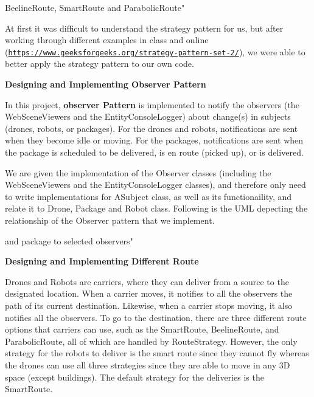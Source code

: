 \begin{center}  Beeline\+Route, Smart\+Route and Parabolic\+Route" \end{center} 

At first it was difficult to understand the strategy pattern for us, but after working through different examples in class and online (\href{https://www.geeksforgeeks.org/strategy-pattern-set-2/}{\tt https\+://www.\+geeksforgeeks.\+org/strategy-\/pattern-\/set-\/2/}), we were able to better apply the strategy pattern to our own code.

{\bfseries Designing and Implementing Observer Pattern} ~\newline


In this project, {\bfseries observer Pattern} is implemented to notify the observers (the Web\+Scene\+Viewers and the Entity\+Console\+Logger) about change(s) in subjects (drones, robots, or packages). For the drones and robots, notifications are sent when they become idle or moving. For the packages, notifications are sent when the package is scheduled to be delivered, is en route (picked up), or is delivered.

We are given the implementation of the Observer classes (including the Web\+Scene\+Viewers and the Entity\+Console\+Logger classes), and therefore only need to write implementations for A\+Subject class, as well as its functionaility, and relate it to Drone, Package and Robot class. Following is the U\+ML depecting the relationship of the Observer pattern that we implement.

\begin{center}  and package to selected observers" \end{center} 

{\bfseries Designing and Implementing Different Route} ~\newline


Drones and Robots are carriers, where they can deliver from a source to the designated location. When a carrier moves, it notifies to all the observers the path of its current destination. Likewise, when a carrier stops moving, it also notifies all the observers. To go to the destination, there are three different route options that carriers can use, such as the Smart\+Route, Beeline\+Route, and Parabolic\+Route, all of which are handled by Route\+Strategy. However, the only strategy for the robots to deliver is the smart route since they cannot fly whereas the drones can use all three strategies since they are able to move in any 3D space (except buildings). The default strategy for the deliveries is the Smart\+Route.

